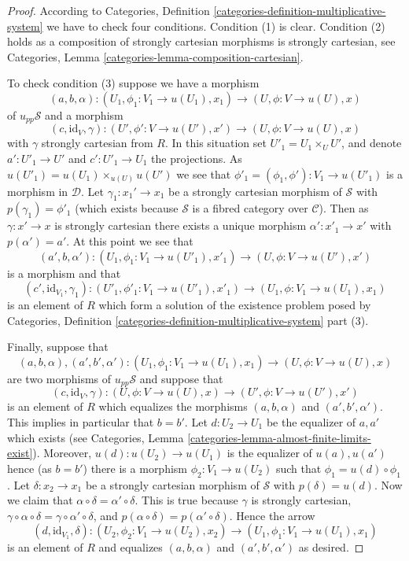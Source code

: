 \begin{proof}
According to
Categories, Definition \ref{categories-definition-multiplicative-system}
we have to check four conditions.
Condition (1) is clear.
Condition (2) holds as a composition of strongly cartesian morphisms is 
strongly cartesian, see
Categories, Lemma \ref{categories-lemma-composition-cartesian}.

\medskip\noindent
To check condition (3) suppose we have a morphism
$$
(a, b, \alpha) :
(U_1, \phi_1 : V_1 \to u(U_1), x_1)
\longrightarrow
(U, \phi : V \to u(U), x)
$$
of $u_{pp}\mathcal{S}$ and a morphism
$$
(c, \text{id}_V, \gamma) :
(U', \phi' : V \to u(U'), x')
\longrightarrow
(U, \phi : V \to u(U), x)
$$
with $\gamma$ strongly cartesian from $R$. In this situation set
$U'_1 = U_1 \times_U U'$, and denote $a' : U'_1 \to U'$ and
$c' : U'_1 \to U_1$ the projections.
As $u(U'_1) = u(U_1) \times_{u(U)} u(U')$
we see that $\phi'_1 = (\phi_1, \phi') : V_1 \to u(U'_1)$ is
a morphism in $\mathcal{D}$. Let $\gamma_1 : x_1' \to x_1$
be a strongly cartesian morphism of $\mathcal{S}$ with
$p(\gamma_1) = \phi'_1$ (which exists because $\mathcal{S}$ is a
fibred category over $\mathcal{C}$). Then as $\gamma : x' \to x$ is
strongly cartesian there exists a unique morphism
$\alpha' : x'_1 \to x'$ with $p(\alpha') = a'$.
At this point we see that
$$
(a', b, \alpha') :
(U_1, \phi_1 : V_1 \to u(U'_1), x'_1)
\longrightarrow
(U, \phi : V \to u(U'), x')
$$
is a morphism and that
$$
(c', \text{id}_{V_1}, \gamma_1) :
(U'_1, \phi'_1 : V_1 \to u(U'_1), x'_1)
\longrightarrow
(U_1, \phi : V_1 \to u(U_1), x_1)
$$
is an element of $R$ which form a solution of the existence problem posed by
Categories, Definition \ref{categories-definition-multiplicative-system}
part (3).

\medskip\noindent
Finally, suppose that
$$
(a, b, \alpha), (a', b', \alpha') :
(U_1, \phi_1 : V_1 \to u(U_1), x_1)
\longrightarrow
(U, \phi : V \to u(U), x)
$$
are two morphisms of $u_{pp}\mathcal{S}$ and suppose that
$$
(c, \text{id}_V, \gamma) :
(U, \phi : V \to u(U), x)
\longrightarrow
(U', \phi : V \to u(U'), x')
$$
is an element of $R$ which equalizes the morphisms
$(a, b, \alpha)$ and $(a', b', \alpha')$. This implies in particular
that $b = b'$. Let $d : U_2 \to U_1$ be the equalizer of $a, a'$ which
exists (see
Categories, Lemma \ref{categories-lemma-almost-finite-limits-exist}).
Moreover, $u(d) : u(U_2) \to u(U_1)$ is the equalizer of $u(a), u(a')$
hence (as $b = b'$) there is a morphism $\phi_2 : V_1 \to u(U_2)$ such that
$\phi_1 = u(d) \circ \phi_1$. Let $\delta : x_2 \to x_1$ be a strongly
cartesian morphism of $\mathcal{S}$ with $p(\delta) = u(d)$.
Now we claim that $\alpha \circ \delta = \alpha' \circ \delta$.
This is true because
$\gamma$ is strongly cartesian,
$\gamma \circ \alpha \circ \delta = \gamma \circ \alpha' \circ \delta$, and
$p(\alpha \circ \delta) = p(\alpha' \circ \delta)$.
Hence the arrow
$$
(d, \text{id}_{V_1}, \delta) :
(U_2, \phi_2 : V_1 \to u(U_2), x_2)
\longrightarrow
(U_1, \phi_1 : V_1 \to u(U_1), x_1)
$$
is an element of $R$ and equalizes $(a, b, \alpha)$ and $(a', b', \alpha')$
as desired.
\end{proof}

